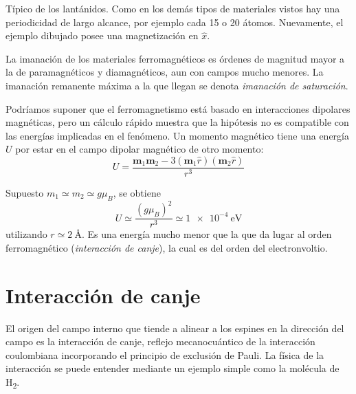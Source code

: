 \documentclass{tufte-book}
\newcommand{\sub}[1]{_{{\scriptscriptstyle\mathit{#1}}}}
\newcommand{\mb}{μ\sub{B}}
\begin{document}
\begin{description}
  \quad
  Típico de los lantánidos. Como en los demás tipos de
materiales vistos hay una periodicidad de largo alcance, por ejemplo
cada 15 o 20 átomos. Nuevamente, el ejemplo dibujado posee una
magnetización en $\hat{x}$.
\end{description}

La imanación de los materiales ferromagnéticos es órdenes de magnitud
mayor a la de paramagnéticos y diamagnéticos, aun con campos mucho
menores. La imanación remanente máxima a la que llegan se denota
\emph{imanación de saturación}.



Podríamos suponer que el ferromagnetismo está basado en interacciones
dipolares magnéticas, pero un cálculo rápido muestra que la hipótesis
no es compatible con las energías implicadas en el fenómeno.
Un momento magnético tiene una energía $U$ por estar en el campo dipolar
magnético de otro momento:
\begin{equation}
  U = \frac{\symbf{m}_1 \symbf{m}_2 - 3(\symbf{m}_1
  \hat{r}) (\symbf{m}_2\hat{r})}{r^3}
\end{equation}

Supuesto $m_1≃m_2≃g\mb$, se obtiene
\begin{equation}
  U ≃ \frac{(g\mb)^2}{r^3} ≃ \SI{1e-4}{\eV}
\end{equation}
utilizando $r≃\SI{2}{\angstrom}$. Es una energía mucho menor que la
que da lugar al orden ferromagnético (\emph{interacción de canje}), la
cual es del orden del electronvoltio.


\section{Interacción de canje}
El origen del campo interno que tiende a alinear a los espines en la
dirección del campo es la interacción de canje, reflejo mecanocuántico
de la interacción coulombiana incorporando el principio de exclusión
de Pauli.
La física de la interacción se puede entender mediante un ejemplo
simple como la molécula de H\textsubscript{2}.
\end{document}
